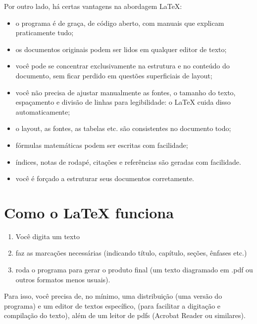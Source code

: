 \documentclass[a4paper,nols,bidi]{tufte-book}
\begin{document}
Por outro lado, há certas vantagens na abordagem \LaTeX:
\begin{itemize}
\item o programa é de graça, de código aberto, com manuais que explicam praticamente tudo;
\item os documentos originais podem ser lidos em qualquer editor de texto;
\item você pode se concentrar exclusivamente na estrutura e no conteúdo do documento, sem ficar perdido em questões superficiais de layout;
\item você não precisa de ajustar manualmente as fontes, o tamanho do texto, espaçamento e divisão de linhas para legibilidade: o \LaTeX{} cuida disso automaticamente;
\item o layout, as fontes, as tabelas etc. são consistentes no documento todo;
\item fórmulas matemáticas podem ser escritas com facilidade;
\item índices, notas de rodapé, citações e referências são geradas com facilidade.
\item você é forçado a estruturar seus documentos corretamente.
\end{itemize}



\section{Como o \LaTeX{} funciona}
 
 \begin{enumerate}
 \item  Você digita um texto \item faz as marcações necessárias (indicando título, capítulo, seções, ênfases etc.) \item  roda o programa para gerar o produto final (um texto diagramado em .pdf ou outros formatos menos usuais).
 \end{enumerate}


Para isso, você precisa de, no mínimo, uma distribuição (uma versão do programa) e um editor de textos específico,  (para facilitar a digitação e compilação do texto), além de um leitor de pdfs (Acrobat Reader ou similares).

\end{document}
